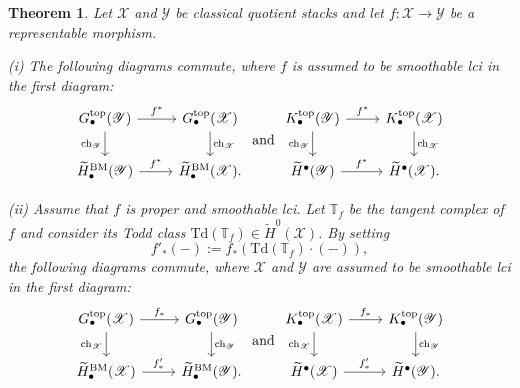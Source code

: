 \documentclass [11pt,oneside,a4paper,mathscr]{amsart}
\newtheorem{thm}{Theorem}[section]
\theoremstyle{definition}
\newcommand{\X}{\mathscr{X}}
\begin{document}
\begin{thm}\label{GRRS}
Let $\X$ and $\mathscr{Y}$ be classical quotient stacks and let $f\colon \X\to\mathscr{Y}$ be a representable morphism. 

(i) The following diagrams commute, where $f$ is assumed to be smoothable lci in the first diagram:
\begin{equation}\label{diagpullb}
    \begin{tikzcd}
        G^{\mathrm{top}}_{\bullet}(\mathscr{Y})\arrow[d, "\mathrm{ch}_\mathscr{Y}"']\arrow[r, "f^*"]& G^{\mathrm{top}}_{\bullet}(\mathscr{X})\arrow[d, "\mathrm{ch}_\mathscr{X}"]\\
        \widetilde{H}^{\mathrm{BM}}_{\bullet}(\mathscr{Y})\arrow[r, "f^*"]& \widetilde{H}^{\mathrm{BM}}_{\bullet}(\mathscr{X}).
    \end{tikzcd}
    \text{ and }
    \begin{tikzcd}
        K^{\mathrm{top}}_{\bullet}(\mathscr{Y})\arrow[d, "\mathrm{ch}_\mathscr{Y}"']\arrow[r, "f^*"]& K^{\mathrm{top}}_{\bullet}(\mathscr{X})\arrow[d, "\mathrm{ch}_\mathscr{X}"]\\
        \widetilde{H}^{\bullet}(\mathscr{Y})\arrow[r, "f^*"]& \widetilde{H}^{\bullet}(\mathscr{X}).
    \end{tikzcd}
\end{equation}

(ii) Assume that $f$ is proper and smoothable lci. 
Let $\mathbb{T}_f$ be the tangent complex of $f$ and consider its Todd class $\mathrm{Td}(\mathbb{T}_f)\in \widetilde{H}^0(\X)$. 
By setting 
\[f'_*(-):=f_*(\mathrm{Td}(\mathbb{T}_f)\cdot(-)),\] 
the following diagrams commute, where $\X$ and $\mathscr{Y}$ are assumed to be smoothable lci in the first diagram:
\begin{equation}\label{diagpushf}
    \begin{tikzcd}
        G^{\mathrm{top}}_{\bullet}(\mathscr{X})\arrow[d, "\mathrm{ch}_\mathscr{X}"']\arrow[r, "f_*"]& G^{\mathrm{top}}_{\bullet}(\mathscr{Y})\arrow[d, "\mathrm{ch}_\mathscr{Y}"]\\
        \widetilde{H}^{\mathrm{BM}}_{\bullet}(\mathscr{X})\arrow[r, "f'_*"]& \widetilde{H}^{\mathrm{BM}}_{\bullet}(\mathscr{Y}).
    \end{tikzcd} \text{ and }
    \begin{tikzcd}
        K^{\mathrm{top}}_{\bullet}(\mathscr{X})\arrow[d, "\mathrm{ch}_\mathscr{X}"']\arrow[r, "f_*"]& K^{\mathrm{top}}_{\bullet}(\mathscr{Y})\arrow[d, "\mathrm{ch}_\mathscr{Y}"]\\
        \widetilde{H}^{\bullet}(\mathscr{X})\arrow[r, "f'_*"]& \widetilde{H}^{\bullet}(\mathscr{Y}).
    \end{tikzcd}
\end{equation}
\end{thm}
\end{document}
